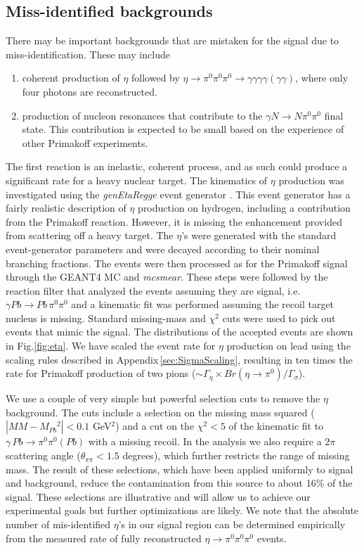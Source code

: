 \subsection{Miss-identified backgrounds}
There may be important backgrounds that are mistaken for the signal due to miss-identification. These may include
\begin{enumerate}[label=(\roman*)]
    \item coherent production of $\eta$ followed by $\eta\rightarrow \pi^0\pi^0\pi^0 \rightarrow \gamma\gamma\gamma\gamma(\gamma\gamma)$, where only four photons are reconstructed.
    \item production of nucleon resonances that contribute to the $\gamma N \rightarrow N \pi^0\pi^0$ final state. This contribution is expected to be small based on the experience of other Primakoff experiments.
\end{enumerate}
The first reaction is an inelastic, coherent process, and as such
could produce a significant rate for a heavy nuclear target. The kinematics of $\eta$ production was investigated using the {\em genEtaRegge} event generator \cite{hdnote2437}. This event generator has a fairly realistic description of $\eta$ production on hydrogen, including a contribution from the Primakoff reaction. However, it is missing the enhancement provided from scattering off a heavy target. The $\eta$'s were generated with the standard event-generator parameters and were decayed according to their nominal branching fractions. The events were then processed as for the Primakoff signal through the GEANT4 MC and {\em mcsmear}. These steps were followed by the reaction filter that analyzed the events assuming they are signal, i.e.  $\gamma Pb \rightarrow Pb\, \pi^0 \pi^0$ and a kinematic fit was performed assuming the recoil target nucleus is missing. Standard missing-mass and $\chi^2$ cuts were used to pick out events that mimic the signal. The distributions of the accepted events are shown in Fig.\ref{fig:eta}. 
We have scaled the event rate for $\eta$ production on lead using the scaling rules described in Appendix\,\ref{sec:SigmaScaling}, resulting in ten times the rate for Primakoff production of two pions ($\sim \Gamma_\eta\times Br(\eta \rightarrow \pi^0)/\Gamma_\sigma$).

We use a couple of very simple but powerful selection cuts to remove the $\eta$ background. The cuts include a selection on the missing mass squared ($|MM - M_{Pb}{^2}| < 0.1$ GeV$^2$) and a cut on the $\chi^2 < 5$ of the kinematic fit to $\gamma\,Pb\rightarrow \pi^0\pi^0 (Pb)$ with a missing recoil. In the analysis we also require a $2\pi$ scattering angle  ($\theta_{\pi\pi} <1.5$ degrees), which further restricts the range of missing mass. The result of these selections, which have been applied uniformly to signal and background, reduce the contamination from this source to about 16\% of the signal. These selections are illustrative and will allow us to achieve our experimental goals but further optimizations are likely. We note that the absolute number of mis-identified $\eta$'s in our signal region can be determined empirically from the measured rate of fully reconstructed $\eta\rightarrow\pi^0\pi^0\pi^0$ events.

